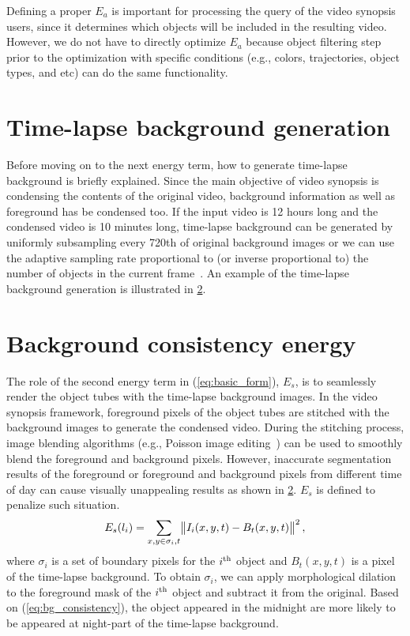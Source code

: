 \documentclass[11pt]{hyu_thesis}
\begin{document}
Defining a proper $E_a$ is important for processing the query of the video synopsis users, since it determines which objects will be included in the resulting video. However, we do not have to directly optimize $E_a$ because object filtering step prior to the optimization with specific conditions (e.g., colors, trajectories, object types, and etc) can do the same functionality.

\section{Time-lapse background generation}
Before moving on to the next energy term, how to generate time-lapse background is briefly explained. Since the main objective of video synopsis is condensing the contents of the original video, background information as well as foreground has be condensed too. If the input video is 12 hours long and the condensed video is 10 minutes long, time-lapse background can be generated by uniformly subsampling every 720th of original background images or we can use the adaptive sampling rate proportional to (or inverse proportional to) the number of objects in the current frame~\cite{Pritch2008}. An example of the time-lapse background generation is illustrated in \ref{}.

\section{Background consistency energy}
The role of the second energy term in (\ref{eq:basic_form}), $E_s$, is to seamlessly render the object tubes with the time-lapse background images. In the video synopsis framework, foreground pixels of the object tubes are stitched with the background images to generate the condensed video. During the stitching process, image blending algorithms (e.g., Poisson image editing~\cite{Perez2003}) can be used to smoothly blend the foreground and background pixels. However, inaccurate segmentation results of the foreground or foreground and background pixels from different time of day can cause visually unappealing results as shown in \ref{}. $E_s$ is defined to penalize such situation.
\begin{equation}
\label{eq:bg_consistency}
E_s(l_i)=\sum_{x,y \in \sigma_i,t}\norm{I_i(x,y,t)-B_t(x,y,t)}^2,
\end{equation}
where $\sigma_i$ is a set of boundary pixels for the $i^{\rm{th}}$ object and $B_t(x,y,t)$ is a pixel of the time-lapse background. To obtain $\sigma_i$, we can apply morphological dilation to the foreground mask of the $i^{\rm{th}}$ object and subtract it from the original. Based on (\ref{eq:bg_consistency}), the object appeared in the midnight are more likely to be appeared at night-part of the time-lapse background.
\end{document}
